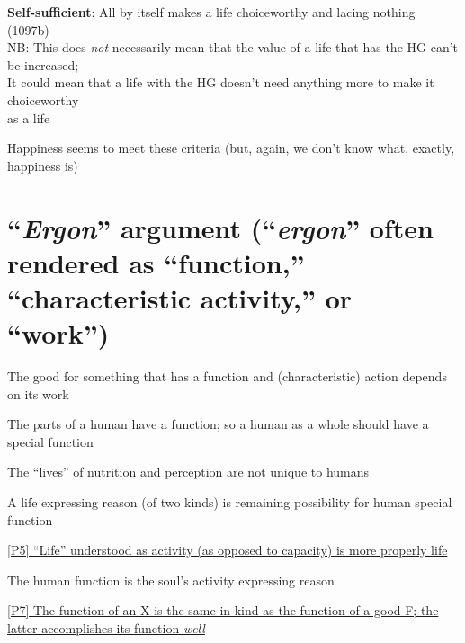 \documentclass[11pt]{article}
\begin{document}
\noindent [D] \textbf{Self-sufficient}: All by itself makes a life choiceworthy and lacing nothing (1097b)\\\hspace*{26mm}NB: This does \emph{not} necessarily mean that the value of a life that has the HG can't be increased;\\\hspace*{26mm} It could mean that a life with the HG doesn't need anything more to make it choiceworthy\\\hspace*{26mm} as a life
\vspace*{2mm}

\noindent Happiness seems to meet these criteria (but, again, we don't know what, exactly, happiness is)
\vspace*{-3mm}

\section*{``\emph{Ergon}'' argument (``\emph{ergon}'' often rendered as ``function,'' ``characteristic activity,'' or ``work'')}

\noindent [P1] The good for something that has a function and (characteristic) action depends on its work
\vspace*{1mm}

\noindent [P2] The parts of a human have a function; so a human as a whole should have a special function
\vspace*{1mm}

\noindent [P3] The ``lives'' of nutrition and perception are not unique to humans
\vspace*{1mm}

\noindent [P4] A life expressing reason (of two kinds) is remaining possibility for human special function
\vspace*{1mm}

\noindent \underline{[P5] ``Life'' understood as activity (as opposed to capacity) is more properly life}
\vspace*{1mm}

\noindent [C1] The human function is the soul's activity expressing reason
\vspace*{3mm}

\noindent\underline{[P7] The function of an X is the same in kind as the function of a good F; the latter accomplishes its function \emph{well}}
\vspace*{-3mm}
\end{document}
